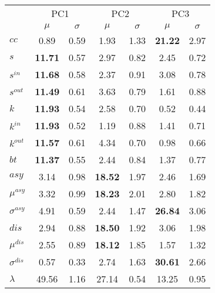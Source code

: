 \begin{center}
\begin{tabular}{| l || c | c | c | c | c | c |}\cline{2-7}
\multicolumn{1}{c|}{} & \multicolumn{2}{c|}{PC1}          & \multicolumn{2}{c|}{PC2} & \multicolumn{2}{c|}{PC3}  \\\cline{2-7}\multicolumn{1}{c|}{} & $\mu$            & $\sigma$ & $\mu$         & $\sigma$ & $\mu$ & $\sigma$  \\\hline
$cc$ &                     0.89  & 0.59  & 1.93  & 1.33  & {\bf 21.22}  & 2.97 \\\hline
$s$ &              {\bf 11.71}  & 0.57  & 2.97  & 0.82  & 2.45  & 0.72 \\
$s^{in}$ &         {\bf 11.68}  & 0.58  & 2.37  & 0.91  & 3.08  & 0.78 \\
$s^{out}$ &        {\bf 11.49}  & 0.61  & 3.63  & 0.79  & 1.61  & 0.88 \\
$k$ &              {\bf 11.93}  & 0.54  & 2.58  & 0.70  & 0.52  & 0.44 \\
$k^{in}$ &         {\bf 11.93}  & 0.52  & 1.19  & 0.88  & 1.41  & 0.71 \\
$k^{out}$ &        {\bf 11.57}  & 0.61  & 4.34  & 0.70  & 0.98  & 0.66 \\
$bt$ &             {\bf 11.37}  & 0.55  & 2.44  & 0.84  & 1.37  & 0.77 \\\hline
$asy$ &                    3.14  & 0.98  & {\bf 18.52}  & 1.97  & 2.46  & 1.69 \\
$\mu^{asy}$              & 3.32  & 0.99  & {\bf 18.23}  & 2.01  & 2.80  & 1.82 \\
$\sigma^{asy}$           & 4.91  & 0.59  & 2.44  & 1.47  & {\bf 26.84}  & 3.06 \\
$dis$                    & 2.94  & 0.88  & {\bf 18.50}  & 1.92  & 3.06  & 1.98 \\
$\mu^{dis}$              & 2.55  & 0.89  & {\bf 18.12}  & 1.85  & 1.57  & 1.32 \\
	$\sigma^{dis}$           & 0.57  & 0.33  & 2.74  & 1.63  & {\bf 30.61}  & 2.66 \\\hline\hline
$\lambda$                & 49.56 & 1.16  & 27.14  & 0.54  & 13.25  & 0.95 \\
\hline\end{tabular}
\end{center}
